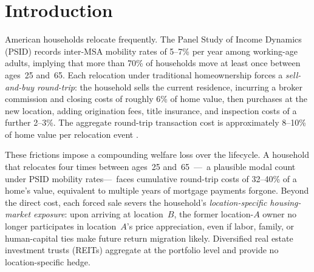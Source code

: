 %
%
%

\section{Introduction}
\label{sec:intro}

American households relocate frequently.
The Panel Study of Income Dynamics (PSID) records inter-MSA mobility rates of
5--7\% per year among working-age adults, implying that more than 70\% of
households move at least once between ages~25 and~65.
Each relocation under traditional homeownership forces a \emph{sell-and-buy
round-trip}: the household sells the current residence, incurring a broker
commission and closing costs of roughly 6\% of home value, then purchases at
the new location, adding origination fees, title insurance, and inspection
costs of a further 2--3\%.
The aggregate round-trip transaction cost is approximately 8--10\% of home
value per relocation event \citep{NAR2023, CFPB2022}.

These frictions impose a compounding welfare loss over the lifecycle.
A household that relocates four times between ages~25 and~65~---~a plausible
modal count under PSID mobility rates---~faces cumulative round-trip costs
of 32--40\% of a home's value, equivalent to multiple years of mortgage
payments forgone.
Beyond the direct cost, each forced sale severs the household's
\emph{location-specific housing-market exposure}: upon arriving at
location~$B$, the former location-$A$ owner no longer participates in
location~$A$'s price appreciation, even if labor, family, or human-capital
ties make future return migration likely.
Diversified real estate investment trusts (REITs) aggregate at the
portfolio level and provide no location-specific hedge.

